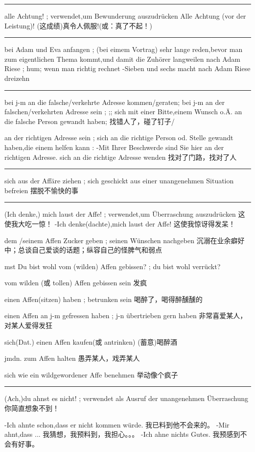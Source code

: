 \noindent\rule{\textwidth}{1pt}  
alle Achtung! ; verwendet,um Bewunderung auszudrücken
Alle Achtung (vor der Leistung)! (这成绩)真令人佩服!(或：真了不起！)

\noindent\rule{\textwidth}{1pt}  
bei Adam und Eva anfangen ; (bei eimem Vortrag) sehr lange reden,bevor man zum eigentlichen Thema kommt,und damit die Zuhörer langweilen
nach Adam Riese ; hum; wenn man richtig rechnet
-Sieben und sechs macht nach Adam Riese dreizehn

\noindent\rule{\textwidth}{1pt}  
bei j-m an die falsche/verkehrte Adresse kommen/geraten; 
bei j-m an der falschen/verkehrten Adresse sein ;
;; sich mit einer Bitte,einem Wunsch o.Ä. an die falsche Person gewandt haben; 
找错人了，碰了钉子/

an der richtigen Adresse sein ; sich an die richtige Person od. Stelle gewandt haben,die einem helfen kann :
-Mit Ihrer Beschwerde sind Sie hier an der richtigen Adresse.
sich an die richtige Adresse wenden 
找对了门路，找对了人

\noindent\rule{\textwidth}{1pt}  
sich aus der Affäre ziehen ; sich geschickt aus einer unangenehmen Situation befreien
摆脱不愉快的事

\noindent\rule{\textwidth}{1pt}  
(Ich denke,) mich laust der Affe! ; verwendet,um Überraschung auszudrücken
这使我大吃一惊！
-Ich denke(dachte),mich laust der Affe! 
这使我惊讶得发呆！

dem /seinem Affen Zucker geben ; seinen Wünschen nachgeben 
沉溺在业余癖好中；总谈自己爱谈的话题；纵容自己的怪脾气和弱点

mst Du bist wohl vom (wilden) Affen gebissen? ; du bist wohl verrückt?

vom wilden (或 tollen) Affen gebissen sein
发疯

einen Affen(sitzen) haben ; betrunken sein
喝醉了，喝得醉醺醺的

einen Affen an j-m gefressen haben ; j-n übertrieben gern haben
非常喜爱某人，对某人爱得发狂

sich(Dat.) einen Affen kaufen(或 antrinken) 
(蓄意)喝醉酒

jmdn. zum Affen halten
愚弄某人，戏弄某人

sich wie ein wildgewordener Affe benehmen 
举动像个疯子

\noindent\rule{\textwidth}{1pt}  
(Ach,)du ahnst es nicht! ; verwendet als Ausruf der unangenehmen Überraschung
你简直想象不到！

-Ich ahnte schon,dass er nicht kommen würde.
我已料到他不会来的。
-Mir ahnt,dass ...
我猜想，我预料到，我担心。。。
-Ich ahne nichts Gutes.
我预感到不会有好事。


